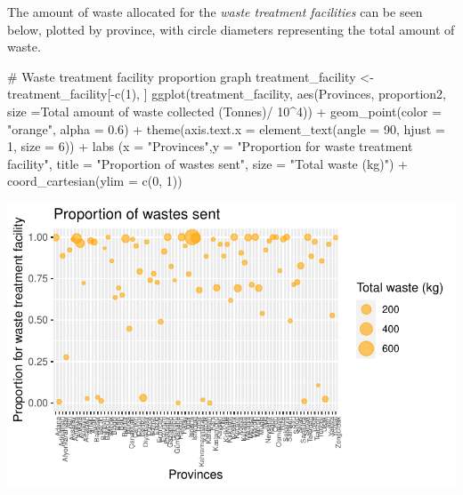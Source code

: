\documentclass[
  11pt,
  a4paper,
  DIV=11,
  numbers=noendperiod]{scrartcl}
\newenvironment{Shaded}{\begin{snugshade}}{\end{snugshade}}
\newcommand{\AttributeTok}[1]{\textcolor[rgb]{0.40,0.45,0.13}{#1}}
\newcommand{\CommentTok}[1]{\textcolor[rgb]{0.37,0.37,0.37}{#1}}
\newcommand{\DecValTok}[1]{\textcolor[rgb]{0.68,0.00,0.00}{#1}}
\newcommand{\FloatTok}[1]{\textcolor[rgb]{0.68,0.00,0.00}{#1}}
\newcommand{\FunctionTok}[1]{\textcolor[rgb]{0.28,0.35,0.67}{#1}}
\newcommand{\NormalTok}[1]{\textcolor[rgb]{0.00,0.23,0.31}{#1}}
\newcommand{\OtherTok}[1]{\textcolor[rgb]{0.00,0.23,0.31}{#1}}
\newcommand{\SpecialCharTok}[1]{\textcolor[rgb]{0.37,0.37,0.37}{#1}}
\newcommand{\StringTok}[1]{\textcolor[rgb]{0.13,0.47,0.30}{#1}}
\begin{document}
The amount of waste allocated for the \emph{waste treatment facilities}
can be seen below, plotted by province, with circle diameters
representing the total amount of waste.

\begin{Shaded}
\begin{Highlighting}[]
\CommentTok{\# Waste treatment facility proportion graph}
\NormalTok{treatment\_facility }\OtherTok{\textless{}{-}}\NormalTok{ treatment\_facility[}\SpecialCharTok{{-}}\FunctionTok{c}\NormalTok{(}\DecValTok{1}\NormalTok{), ]}
\FunctionTok{ggplot}\NormalTok{(treatment\_facility, }\FunctionTok{aes}\NormalTok{(Provinces, proportion2, }\AttributeTok{size =}\StringTok{\textasciigrave{}}\AttributeTok{Total amount of waste collected  (Tonnes)}\StringTok{\textasciigrave{}}\SpecialCharTok{/} \DecValTok{10}\SpecialCharTok{\^{}}\DecValTok{4}\NormalTok{)) }\SpecialCharTok{+}
  \FunctionTok{geom\_point}\NormalTok{(}\AttributeTok{color =} \StringTok{"orange"}\NormalTok{, }\AttributeTok{alpha =} \FloatTok{0.6}\NormalTok{) }\SpecialCharTok{+}  \FunctionTok{theme}\NormalTok{(}\AttributeTok{axis.text.x =} \FunctionTok{element\_text}\NormalTok{(}\AttributeTok{angle =} \DecValTok{90}\NormalTok{, }\AttributeTok{hjust =} \DecValTok{1}\NormalTok{, }\AttributeTok{size =} \DecValTok{6}\NormalTok{)) }\SpecialCharTok{+}
  \FunctionTok{labs}\NormalTok{ (}\AttributeTok{x =} \StringTok{"Provinces"}\NormalTok{,}\AttributeTok{y =} \StringTok{"Proportion for waste treatment facility"}\NormalTok{, }\AttributeTok{title =} \StringTok{"Proportion of wastes sent"}\NormalTok{, }\AttributeTok{size =} \StringTok{"Total waste (kg)"}\NormalTok{) }\SpecialCharTok{+} \FunctionTok{coord\_cartesian}\NormalTok{(}\AttributeTok{ylim =} \FunctionTok{c}\NormalTok{(}\DecValTok{0}\NormalTok{, }\DecValTok{1}\NormalTok{)) }
\end{Highlighting}
\end{Shaded}

\includegraphics{project_files/figure-pdf/unnamed-chunk-18-1.pdf}
\end{document}

